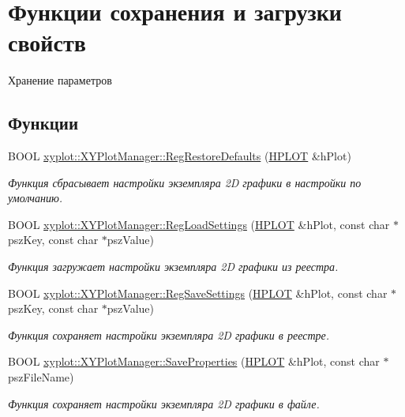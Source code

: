 \hypertarget{group__gr_properties}{\section{Функции сохранения и загрузки свойств}
\label{group__gr_properties}
}


Хранение параметров  


\subsection*{Функции}
\begin{DoxyCompactItemize}
\item 
B\-O\-O\-L \hyperlink{group__gr_properties_ga86742bc6603db4141caaee586872e5df}{xyplot\-::\-X\-Y\-Plot\-Manager\-::\-Reg\-Restore\-Defaults} (\hyperlink{classxyplot_1_1_h_p_l_o_t}{H\-P\-L\-O\-T} \&h\-Plot)
\begin{DoxyCompactList}\small\item\em Функция сбрасывает настройки экземпляра 2\-D графики в настройки по умолчанию. \end{DoxyCompactList}\item 
B\-O\-O\-L \hyperlink{group__gr_properties_ga24942314b181fa7f547629d15577589d}{xyplot\-::\-X\-Y\-Plot\-Manager\-::\-Reg\-Load\-Settings} (\hyperlink{classxyplot_1_1_h_p_l_o_t}{H\-P\-L\-O\-T} \&h\-Plot, const char $\ast$psz\-Key, const char $\ast$psz\-Value)
\begin{DoxyCompactList}\small\item\em Функция загружает настройки экземпляра 2\-D графики из реестра. \end{DoxyCompactList}\item 
B\-O\-O\-L \hyperlink{group__gr_properties_ga07f14ff8585116fcf19f7421a0c9e64f}{xyplot\-::\-X\-Y\-Plot\-Manager\-::\-Reg\-Save\-Settings} (\hyperlink{classxyplot_1_1_h_p_l_o_t}{H\-P\-L\-O\-T} \&h\-Plot, const char $\ast$psz\-Key, const char $\ast$psz\-Value)
\begin{DoxyCompactList}\small\item\em Функция сохраняет настройки экземпляра 2\-D графики в реестре. \end{DoxyCompactList}\item 
B\-O\-O\-L \hyperlink{group__gr_properties_gaa8c0d039a585af0356d553ba7a76f152}{xyplot\-::\-X\-Y\-Plot\-Manager\-::\-Save\-Properties} (\hyperlink{classxyplot_1_1_h_p_l_o_t}{H\-P\-L\-O\-T} \&h\-Plot, const char $\ast$psz\-File\-Name)
\begin{DoxyCompactList}\small\item\em Функция сохраняет настройки экземпляра 2\-D графики в файле. \end{DoxyCompactList}\item 

\end{DoxyCompactItemize}
